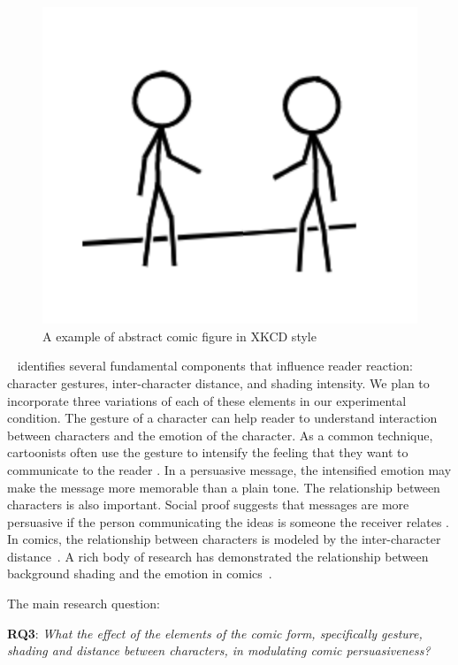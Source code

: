 \begin{figure}
 \centering
 \includegraphics[width=0.3\columnwidth]{figures/xkcd_example}
 \caption{A example of abstract comic figure in XKCD style}
 \label{fig:xkcd}
\end{figure}

~\textcite{scott1993understanding} identifies several fundamental components that influence reader reaction: character gestures, inter-character distance, and shading intensity. We plan to incorporate three variations of each of these elements in our experimental condition.
The gesture of a character can help reader to understand interaction between characters and the emotion of the character. As a common technique, cartoonists often use the gesture to intensify the feeling that they want to communicate to the reader \cite{scott1993understanding}. In a persuasive message, the intensified emotion may make the message more memorable than a plain tone.  The relationship between characters is also important. Social proof suggests that messages are more persuasive if the person communicating the ideas is someone the receiver relates \cite{Cialdini1993}.  In comics, the relationship between characters is modeled by the inter-character distance~\cite{scott1993understanding}.  A rich body of research has demonstrated the relationship between background shading and the emotion in comics~\cite{scott1993understanding}.

The main research question:

\textbf{RQ3}: \textit{What the effect of the elements of the comic form, specifically gesture, shading and distance between characters, in modulating comic persuasiveness?}
